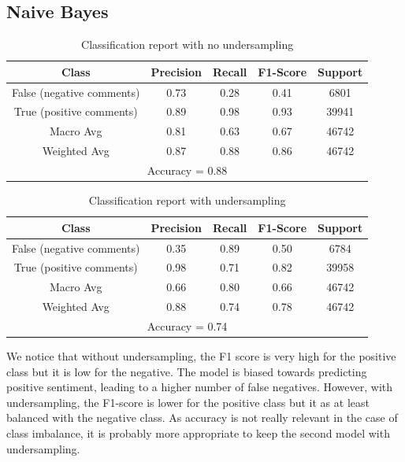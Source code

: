 \documentclass{article}
\begin{document}
\subsection{Naive Bayes}

\begin{table}[H]
  \centering
  \begin{tabular}{ccccc}
  \hline
  Class & Precision & Recall & F1-Score & Support \\
  \hline
  False (negative comments) & 0.73 & 0.28 & 0.41 & 6801 \\
  True (positive comments) & 0.89 & 0.98 & 0.93 & 39941 \\
  \hline
  Macro Avg & 0.81 & 0.63 & 0.67 & 46742 \\
  Weighted Avg & 0.87 & 0.88 & 0.86 & 46742 \\
  \hline
  \multicolumn{5}{c}{Accuracy = 0.88} \\
  \hline
  \end{tabular}
  \caption{Classification report with no undersampling}
  \label{tab:KNN}
\end{table}

\begin{table}[H]
  \centering
  \begin{tabular}{ccccc}
  \hline
  Class & Precision & Recall & F1-Score & Support \\
  \hline
  False (negative comments) & 0.35 & 0.89 & 0.50 & 6784 \\
  True (positive comments) & 0.98 & 0.71 & 0.82 & 39958 \\
  \hline
  Macro Avg & 0.66 & 0.80 & 0.66 & 46742 \\
  Weighted Avg & 0.88 & 0.74 & 0.78 & 46742 \\
  \hline
  \multicolumn{5}{c}{Accuracy = 0.74} \\
  \hline
  \end{tabular}
  \caption{Classification report with undersampling}
  \label{tab:classification_report}
\end{table}

We notice that without undersampling, the F1 score is very high for the positive class but it is low for the negative. The model is biased towards predicting positive sentiment, leading to a higher number of false negatives. 
However, with undersampling, the F1-score is lower for the positive class but it as at least balanced with the negative class. As accuracy is not really relevant in the case of class imbalance, it is probably more appropriate to keep the second model with undersampling.
\end{document}
